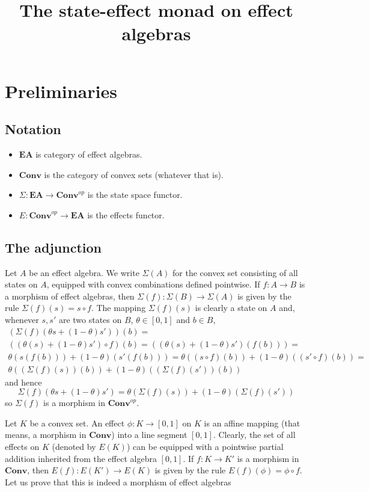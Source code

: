 \documentclass{amsart}
\newcommand{\EA}{\mathbf{EA}}
\newcommand{\Conv}{\mathbf{Conv}}
\newcommand{\Convop}{\mathbf{Conv}^{op}}
\newcommand{\states}{\Sigma}
\newcommand{\effects}{E}
\begin{document}
\title{The state-effect monad on effect algebras}

\section{Preliminaries}
\subsection{Notation}
\begin{itemize}
\item $\EA$ is category of effect algebras.
\item $\Conv$ is the category of convex sets (whatever that is).
\item $\states:\EA\to\Convop$ is the state space functor.
\item $\effects:\Convop\to\EA$ is the effects functor.
\end{itemize}
\subsection{The adjunction}
Let $A$ be an effect algebra. We write $\states(A)$ for the convex set consisting of all states
on $A$, equipped with convex combinations defined pointwise. If $f:A\to B$ is a morphism
of effect algebras, then $\states(f):\states(B)\to\states(A)$ is given by the 
rule $\states(f)(s)=s\circ f$. The mapping $\states(f)(s)$ is clearly a
state on $A$ and, whenever $s,s'$ are two states on $B$, $\theta\in[0,1]$ and $b\in B$,
\begin{align*}
(\states(f)(\theta s+(1-\theta)s'))(b)=\\
((\theta(s)+(1-\theta)s')\circ f)(b)=
((\theta(s)+(1-\theta)s')(f(b)))=\\
\theta(s(f(b)))+(1-\theta)(s'(f(b)))=
\theta((s\circ f)(b))+(1-\theta)((s' \circ f)(b))=\\
\theta((\states(f)(s))(b))+(1-\theta)((\states(f)(s'))(b))
\end{align*}
and hence
$$
\states(f)(\theta s+(1-\theta)s')=
\theta(\states(f)(s))+(1-\theta)(\states(f)(s'))
$$
so $\states(f)$ is a morphism in $\Convop$.

Let $K$ be a convex set. An effect $\phi:K\to[0,1]$ on $K$ is an affine mapping 
(that means, a morphism in $\Conv$) into a line segment $[0,1]$. Clearly, the set of all effects on $K$ 
(denoted by $\effects(K)$) can be equipped with a pointwise partial addition inherited from the effect algebra 
$[0,1]$. If $f:K\to K'$ is a morphism in $\Conv$, then $E(f):E(K')\to E(K)$ is given by the rule
$E(f)(\phi)=\phi\circ f$. Let us prove that this is indeed a morphism of effect algebras
\end{document}
